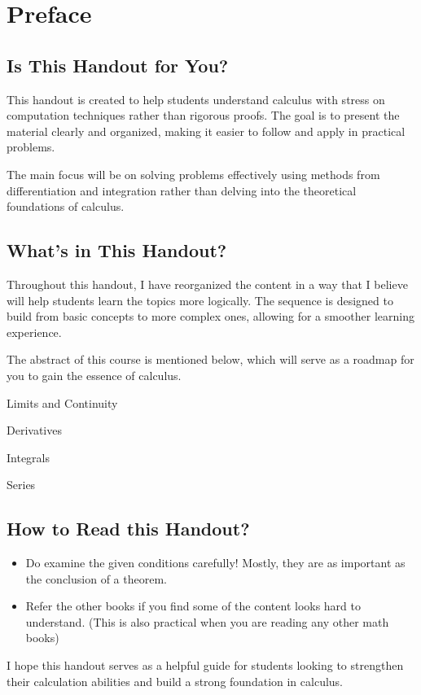 \chapter*{Preface}

\section{Is This Handout for You?}
This handout is created to help students understand calculus with stress on computation techniques rather than rigorous proofs. The goal is to present the material clearly and organized, making it easier to follow and apply in practical problems.


The main focus will be on solving problems effectively using methods from differentiation and integration rather than delving into the theoretical foundations of calculus. 
\section{What's in This Handout?}

Throughout this handout, I have reorganized the content in a way that I believe will help students learn the topics more logically. The sequence is designed to build from basic concepts to more complex ones, allowing for a smoother learning experience.


The abstract of this course is mentioned below, which will serve as
a roadmap for you to gain the essence of calculus.
\begin{introduction}
    \item Limits and Continuity
    \item Derivatives
    \item Integrals
    \item Series
\end{introduction}

\section{How to Read this Handout?}
\begin{itemize}
    \item Do examine the given conditions carefully! Mostly, they are as important as the conclusion of a theorem.
    \item Refer the other books if you find some of the content looks hard to understand. (This is also practical when you are reading any other math books)
\end{itemize}




I hope this handout serves as a helpful guide for students looking to strengthen their calculation abilities and build a strong foundation in calculus.